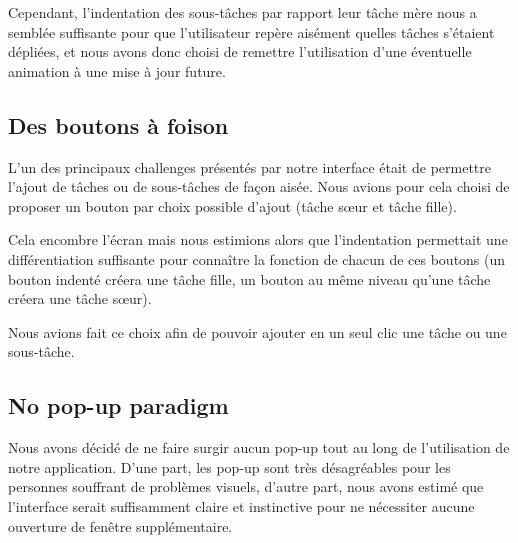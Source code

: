 \documentclass[11pt]{article}
\begin{document}
Cependant, l'indentation des sous-tâches par rapport leur tâche mère
nous a semblée suffisante pour que l'utilisateur repère aisément
quelles tâches s'étaient dépliées, et nous avons donc choisi de
remettre l'utilisation d'une éventuelle animation à une mise à jour
future.




\subsection{Des boutons à foison}

L'un des principaux challenges présentés par notre interface était de
permettre l'ajout de tâches ou de sous-tâches de façon aisée. Nous
avions pour cela choisi de proposer un bouton par choix possible
d'ajout (tâche sœur et tâche fille).

Cela encombre l'écran mais nous estimions alors que l'indentation
permettait une différentiation suffisante pour connaître la fonction
de chacun de ces boutons (un bouton indenté créera une tâche fille, un
bouton au même niveau qu'une tâche créera une tâche sœur).

Nous avions fait ce choix afin de pouvoir ajouter en un seul clic une
tâche ou une sous-tâche.




\subsection{No pop-up paradigm}

Nous avons décidé de ne faire surgir aucun pop-up tout au long de
l'utilisation de notre application. D'une part, les pop-up sont très
désagréables pour les personnes souffrant de problèmes visuels,
d'autre part, nous avons estimé que l'interface serait suffisamment
claire et instinctive pour ne nécessiter aucune ouverture de fenêtre
supplémentaire.
\end{document}
